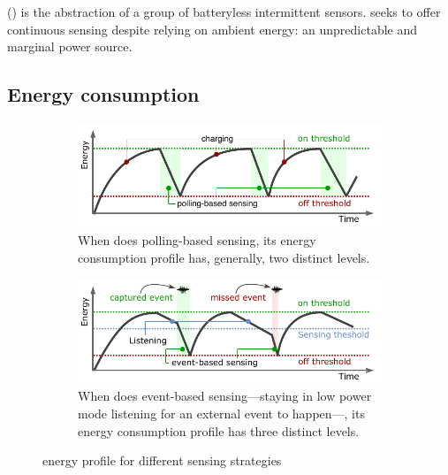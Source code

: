 \fullsys (\sys) is the abstraction of a group of batteryless intermittent sensors. \sys seeks to offer continuous sensing despite relying on ambient energy: an unpredictable and marginal power source. 

\subsection{Energy consumption}
%
\begin{figure}[t]
	\centering
		\begin{subfigure}{\columnwidth}
			\includegraphics[width=\columnwidth]{figures/PowerCycleIntermittentSystem}
			\caption{When \sys does polling-based sensing, its energy consumption profile has, generally, two distinct levels.}
			\label{fig:pollingBasedSensing}
	\end{subfigure}
	\begin{subfigure}{\columnwidth}
		\includegraphics[width=\columnwidth]{figures/PowerCycleIntermittentSensor}
		\caption{When \sys does event-based sensing---staying in low power mode listening for an external event to happen---, its energy consumption profile has three distinct levels.}
		\label{fig:eventBasedSensing}
\end{subfigure}
		\caption{\fullsys energy profile for different sensing strategies}
		\label{fig:cisPwrCycle}
\end{figure} 
